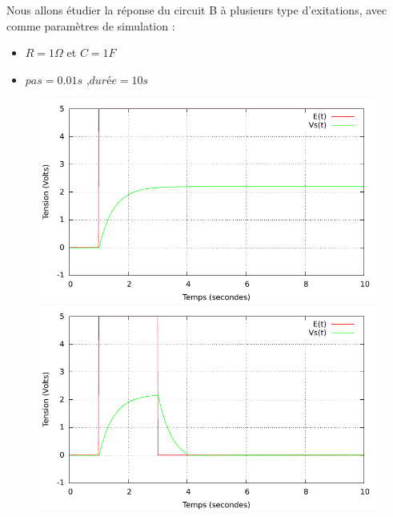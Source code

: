 \documentclass[a4paper,11pt]{article}
\begin{document}
   Nous allons étudier la réponse du circuit B à plusieurs type d'exitations, avec comme paramètres de simulation :  \\
  \begin{itemize}
   \item $R = 1 \Omega$ et $C = 1 F$
     \item $pas = 0.01 s$ ,$durée = 10s$ 
  \end{itemize}
 
  \begin{figure}[h!]
   \begin{minipage}[b]{0.5\linewidth}
      \centering \includegraphics[scale=0.68]{CBechelon.pdf}
   \end{minipage}\hfill
   \begin{minipage}[b]{0.5\linewidth}   
      \centering \includegraphics[scale=.68]{CBporte.pdf}
   \end{minipage}\\
    \begin{minipage}[b]{0.5\linewidth}   

\end{minipage}
\end{figure}
\end{document}
